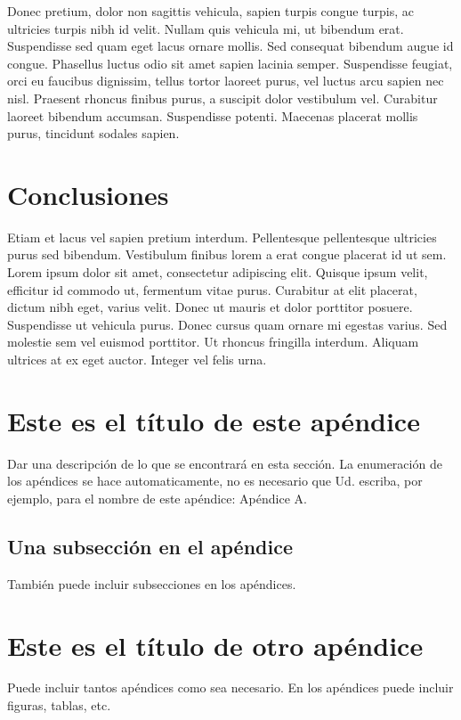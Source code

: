 \documentclass[artMGITG,SIG,accept,moreauthors,font4]{mgitg}
\begin{document}
Donec pretium, dolor non sagittis vehicula, sapien turpis congue turpis, ac ultricies turpis nibh id velit. Nullam quis vehicula mi, ut bibendum erat. Suspendisse sed quam eget lacus ornare mollis. Sed consequat bibendum augue id congue. Phasellus luctus odio sit amet sapien lacinia semper. Suspendisse feugiat, orci eu faucibus dignissim, tellus tortor laoreet purus, vel luctus arcu sapien nec nisl. Praesent rhoncus finibus purus, a suscipit dolor vestibulum vel. Curabitur laoreet bibendum accumsan. Suspendisse potenti. Maecenas placerat mollis purus, tincidunt sodales sapien. 

\section{Conclusiones}
%
\noindent
Etiam et lacus vel sapien pretium interdum. Pellentesque pellentesque ultricies purus sed bibendum. Vestibulum finibus lorem a erat congue placerat id ut sem. Lorem ipsum dolor sit amet, consectetur adipiscing elit. Quisque ipsum velit, efficitur id commodo ut, fermentum vitae purus. Curabitur at elit placerat, dictum nibh eget, varius velit. Donec ut mauris et dolor porttitor posuere. Suspendisse ut vehicula purus. Donec cursus quam ornare mi egestas varius. Sed molestie sem vel euismod porttitor. Ut rhoncus fringilla interdum. Aliquam ultrices at ex eget auctor. Integer vel felis urna. 





\appendix   %
\section{Este es el título de este apéndice}
Dar una descripción de lo que se encontrará en esta sección. La enumeración de los apéndices se hace automaticamente, no es necesario que Ud. escriba, por ejemplo, para el nombre de este apéndice: Apéndice A.

\subsection{Una subsección en el apéndice}
También puede incluir subsecciones en los apéndices.

\section{Este es el título de otro apéndice}
Puede incluir tantos apéndices como sea necesario. En los apéndices puede incluir figuras, tablas, etc.
\end{document}
